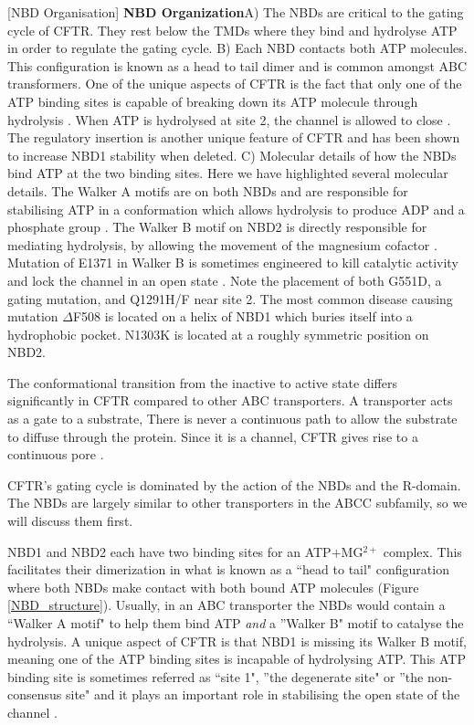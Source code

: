 	[NBD Organisation] {\textbf{NBD Organization}}{A) The NBDs are critical to the gating cycle of CFTR. They rest below the TMDs where they bind and hydrolyse ATP in order to regulate the gating cycle. B) Each NBD contacts both ATP molecules. This configuration is known as a head to tail dimer and is common amongst ABC transformers. One of the unique aspects of CFTR is the fact that only one of the ATP binding sites is capable of breaking down its ATP molecule through hydrolysis \cite{stratford2007}. When ATP is hydrolysed at site 2, the channel is allowed to close \cite{infield2021}. The regulatory insertion is another unique feature of CFTR and has been shown to increase NBD1 stability when deleted.  C) Molecular details of how the NBDs bind ATP at the two binding sites. Here we have highlighted several molecular details. The Walker A motifs are on both NBDs and are responsible for stabilising ATP in a conformation which allows hydrolysis to produce ADP and a phosphate group \cite{deltoro2016}. The Walker B motif on NBD2 is directly responsible for mediating hydrolysis, by allowing the movement of the magnesium cofactor \cite{urbatsch2000, rai2006}. Mutation of E1371 in Walker B is sometimes engineered to kill catalytic activity and lock the channel in an open state \cite{stratford2007, zhang2018}. Note the placement of both G551D, a gating mutation, and Q1291H/F near site 2. The most common disease causing mutation $\Delta$F508 is located on a helix of NBD1 which buries itself into a hydrophobic pocket. N1303K is located at a roughly symmetric position on NBD2. } 

\label{NBD_structure}
\endgroup

The conformational transition from the inactive to active state differs significantly in CFTR compared to other ABC transporters. A transporter acts as a gate to a substrate, There is never a continuous path to allow the substrate to diffuse through the protein. Since it is a channel, CFTR gives rise to a continuous pore \cite{linsdell2018}. 

CFTR's gating cycle is dominated by the action of the NBDs and the R-domain. The NBDs are largely similar to other transporters in the ABCC subfamily, so we will discuss them first. 

NBD1 and NBD2 each have two binding sites for an ATP$+$MG$^{2+}$ complex. This facilitates their dimerization in what is known as a ``head to tail" configuration where both NBDs make contact with both bound ATP molecules \cite{gout2012}  (Figure \ref{NBD_structure}). Usually, in an ABC transporter the NBDs would contain a ``Walker A motif" to help them bind ATP \textit {and} a ''Walker B" motif to catalyse the hydrolysis. A unique aspect of CFTR is that NBD1 is missing its Walker B motif, meaning one of the ATP binding sites is incapable of hydrolysing ATP. This ATP binding site is sometimes referred as ``site 1", ''the degenerate site" or ''the non-consensus site" and it plays an important role in stabilising the open state of the channel \cite{yeh2022, csanady2019a}.

